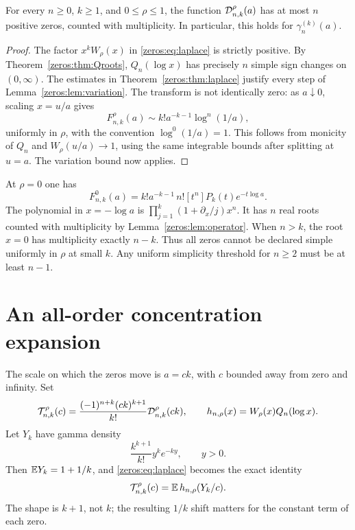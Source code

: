 \begin{theorem}\label{zeros:thm:globalzeros}
For every $n\geq0$, $k\geq1$, and $0\leq\rho\leq1$, the function $\mathcal D_{n,k}^{\rho}(a)$ has at most $n$ positive zeros, counted with multiplicity. In particular, this holds for $\gamma_n^{(k)}(a)$.
\end{theorem}
\begin{proof}
The factor $x^kW_\rho(x)$ in \eqref{zeros:eq:laplace} is strictly positive. By Theorem~\ref{zeros:thm:Qroots}, $Q_n(\log x)$ has precisely $n$ simple sign changes on $(0,\infty)$. The estimates in Theorem~\ref{zeros:thm:laplace} justify every step of Lemma~\ref{zeros:lem:variation}. The transform is not identically zero: as $a\downarrow0$, scaling $x=u/a$ gives
\begin{equation}\label{zeros:eq:small-a}
 F_{n,k}^{\rho}(a)\sim k!a^{-k-1}\log^n(1/a),
\end{equation}
uniformly in $\rho$, with the convention $\log^0(1/a)=1$. This follows from monicity of $Q_n$ and $W_\rho(u/a)\to1$, using the same integrable bounds after splitting at $u=a$. The variation bound now applies.
\end{proof}

\begin{remark}
At $\rho=0$ one has
\[
 F_{n,k}^{0}(a)=k!a^{-k-1}\,n![t^n]P_k(t)e^{-t\log a}.
\]
The polynomial in $x=-\log a$ is $\prod_{j=1}^k(1+\partial_x/j)x^n$. It has $n$ real roots counted with multiplicity by Lemma~\ref{zeros:lem:operator}. When $n>k$, the root $x=0$ has multiplicity exactly $n-k$. Thus all zeros cannot be declared simple uniformly in $\rho$ at small $k$. Any uniform simplicity threshold for $n\geq2$ must be at least $n-1$.
\end{remark}

\section{An all-order concentration expansion}
\label{zeros:sec:concentration}

The scale on which the zeros move is $a=ck$, with $c$ bounded away from zero and infinity. Set
\begin{equation}\label{zeros:eq:normalized}
 \mathcal T_{n,k}^{\rho}(c)
   =\frac{(-1)^{n+k}(ck)^{k+1}}{k!}\mathcal D_{n,k}^{\rho}(ck),
 \qquad h_{n,\rho}(x)=W_\rho(x)Q_n(\log x).
\end{equation}
Let $Y_k$ have gamma density
\[
 \frac{k^{k+1}}{k!}y^k e^{-ky},\qquad y>0.
\]
Then $\mathbb E Y_k=1+1/k$, and \eqref{zeros:eq:laplace} becomes the exact identity
\begin{equation}\label{zeros:eq:expectation}
 \mathcal T_{n,k}^{\rho}(c)=\mathbb E\,h_{n,\rho}(Y_k/c).
\end{equation}
The shape is $k+1$, not $k$; the resulting $1/k$ shift matters for the constant term of each zero.

